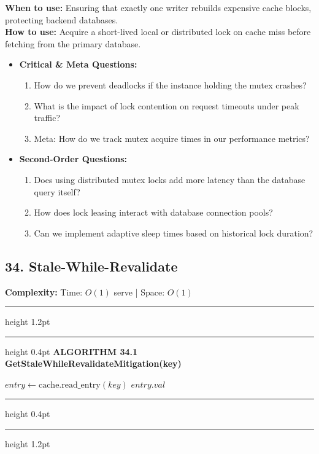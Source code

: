 \documentclass[11pt,a4paper]{article}
\newenvironment{textbookalgo}[2]{%
  \par\addvspace{1.2em}\noindent
  \hrule height 1.2pt
  \vspace{1.5pt}
  \hrule height 0.4pt
  \vspace{5pt}
  {\noindent\large\bfseries\sffamily ALGORITHM #1 \quad #2}
  \par\vspace{5pt}
  \RestyleAlgo{plain}
}{%
  \par\vspace{4pt}
  \hrule height 0.4pt
  \vspace{1.5pt}
  \hrule height 1.2pt
  \par\addvspace{1.2em}
}
\theoremstyle{definition}
\begin{document}
\noindent
\textbf{When to use:} Ensuring that exactly one writer rebuilds expensive cache blocks, protecting backend databases.\\
\textbf{How to use:} Acquire a short-lived local or distributed lock on cache miss before fetching from the primary database.
\begin{itemize}[leftmargin=*]
  \item[] \textbf{Critical \& Meta Questions:}
  \begin{enumerate}
    \item How do we prevent deadlocks if the instance holding the mutex crashes?
    \item What is the impact of lock contention on request timeouts under peak traffic?
    \item Meta: How do we track mutex acquire times in our performance metrics?
  \end{enumerate}
  \item[] \textbf{Second-Order Questions:}
  \begin{enumerate}
    \item Does using distributed mutex locks add more latency than the database query itself?
    \item How does lock leasing interact with database connection pools?
    \item Can we implement adaptive sleep times based on historical lock duration?
  \end{enumerate}
\end{itemize}
\medskip


\clearpage
\subsection{34. Stale-While-Revalidate}

\noindent
\textbf{Complexity:} Time: $O(1)$ serve | Space: $O(1)$
\smallskip

\begin{textbookalgo}{34.1}{GetStaleWhileRevalidateMitigation(key)}
\begin{algorithm}[H]
$entry \leftarrow \text{cache.read\_entry}(key)$\;
\Return $entry.val$\;
\end{algorithm}
\end{textbookalgo}
\end{document}
